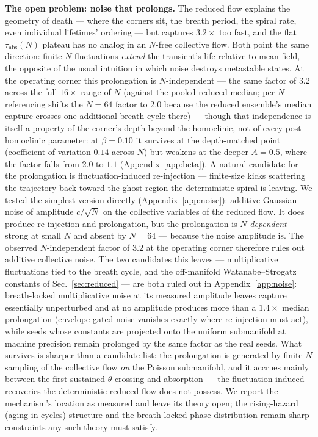 \documentclass[pdflatex,sn-mathphys,Numbered]{sn-jnl}
\begin{document}
\textbf{The open problem: noise that prolongs.} The reduced flow explains the
geometry of death --- where the corners sit, the breath period, the spiral rate,
even individual lifetimes' ordering --- but captures $3.2\times$ too fast, and the
flat $\tau_{\mathrm{abs}}(N)$ plateau has no analog in an $N$-free collective flow.
Both point the same direction: finite-$N$ fluctuations \emph{extend} the transient's
life relative to mean-field, the opposite of the usual intuition in which noise
destroys metastable states. At the operating corner this prolongation is $N$-independent --- the same factor of
$3.2$ across the full $16\times$ range of $N$ (against the pooled reduced median;
per-$N$ referencing shifts the $N = 64$ factor to $2.0$ because the reduced
ensemble's median capture crosses one additional breath cycle there) --- though
that independence is itself
a property of the corner's depth beyond the homoclinic, not of every post-homoclinic
parameter: at $\beta = 0.10$ it survives at the depth-matched point (coefficient of
variation $0.14$ across $N$) but weakens at the deeper $A = 0.5$, where the factor
falls from $2.0$ to $1.1$ (Appendix~\ref{app:beta}). A natural candidate for the
prolongation is fluctuation-induced re-injection --- finite-size kicks scattering the
trajectory back toward the ghost region the deterministic spiral is leaving. We
tested the simplest version directly (Appendix~\ref{app:noise}): additive Gaussian
noise of amplitude $c/\sqrt N$ on the collective variables of the reduced flow. It
does produce re-injection and prolongation, but the prolongation is
$N$-\emph{dependent} --- strong at small $N$ and absent by $N = 64$ --- because the
noise amplitude is. The observed $N$-independent factor of $3.2$ at the operating corner therefore
rules out additive collective noise. The two candidates this leaves ---
multiplicative fluctuations tied to the breath cycle, and the off-manifold
Watanabe--Strogatz constants of Sec.~\ref{sec:reduced} --- are both ruled out
in Appendix~\ref{app:noise}: breath-locked multiplicative noise at its measured
amplitude leaves capture essentially unperturbed and at no amplitude produces
more than a $1.4\times$ median prolongation (envelope-gated noise vanishes
exactly where re-injection must act), while seeds whose constants are projected
onto the uniform
submanifold at machine precision remain prolonged by the same factor as the
real seeds. What survives is sharper than a candidate list: the prolongation is
generated by finite-$N$ sampling of the collective flow \emph{on} the Poisson
submanifold, and it accrues mainly between the first sustained $\theta$-crossing
and absorption --- the fluctuation-induced recoveries the deterministic reduced
flow does not possess. We report the mechanism's location as measured and leave
its theory open; the rising-hazard (aging-in-cycles) structure and the
breath-locked phase distribution remain sharp constraints any such theory must
satisfy.
\end{document}

